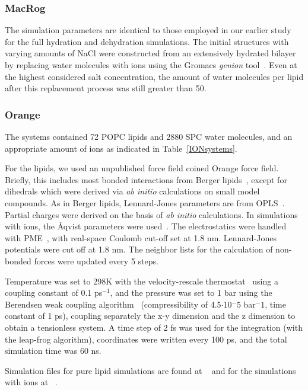 \documentclass[twoside,twocolumn,9pt]{article}
\begin{document}
\subsubsection{MacRog}
The simulation parameters are identical to those employed in our earlier study~\cite{botan15} for the full 
hydration and dehydration simulations. The initial structures with varying amounts of NaCl were constructed from an 
extensively hydrated bilayer by replacing water molecules with ions using the Gromacs {\it genion} tool~\cite{gromacsMANUAL}. Even at the highest 
considered salt concentration, the amount of water molecules per lipid after this replacement process was still greater than 50.

\subsubsection{Orange}
The systems contained 72 POPC lipids and 2880 SPC water molecules, and an appropriate amount of ions as indicated in 
Table~\ref{IONsystems}.  

For the lipids, we used an unpublished force field coined Orange force field. 
Briefly, this includes most bonded interactions from Berger lipids~\cite{berger97}, 
except for dihedrals which were derived via \textit{ab initio} calculations on small model compounds. 
As in Berger lipids, Lennard-Jones parameters are from OPLS~\cite{jorgensen84,jorgensen86a,jorgensen86b,jorgensen88,briggs91}.
Partial charges were derived on the basis of \textit{ab initio} calculations. 
In simulations with ions, the \r{A}qvist parameters were used~\cite{aqvist90}. 
The electrostatics were handled with PME~\cite{darden93,essman95}, with real-space Coulomb cut-off set at 1.8 nm. 
Lennard-Jones potentials were cut off at 1.8 nm. 
The neighbor lists for the calculation of non-bonded forces were updated every 5 steps.

Temperature was set to 298K with the velocity-rescale thermostat~\cite{bussi07} using a coupling constant of 0.1 ps$^{-1}$, and the pressure was set to 1 bar using the Berendsen weak coupling algorithm~\cite{berendsen84} (compressibility of 4.5$\cdot$10$^-5$ bar$^-1$, time constant of 1 ps), coupling separately the x-y dimension and the z dimension to obtain a tensionless system. 
A time step of 2 fs was used for the integration (with the leap-frog algorithm), coordinates were written every 100 ps, 
and the total simulation time was 60 ns. 

Simulation files for pure lipid simulations are found at ~\cite{orangePOPCfiles} and for the simulations with ions at ~\cite{orangePOPC140mMNaClfiles,orangePOPC510mMNaClfiles,orangePOPC510mMCaClfiles,orangePOPC1000mMNaClfiles}.
\end{document}
